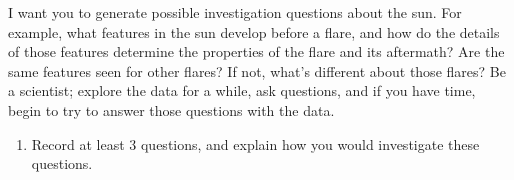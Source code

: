 \documentclass[11pt]{article}%
\begin{document}
I want you to generate possible investigation questions about the sun. For example, what features in the sun develop before a flare, and how do the details of those features determine the properties of the flare and its aftermath? Are the same features seen for other flares? If not, what's different about those flares? Be a scientist; explore the data for a while, ask questions, and if you have time, begin to try to answer those questions with the data. \\
\begin{enumerate}
\item Record at least 3 questions, and explain how you would investigate these questions. 
\end{enumerate}
\end{document}
